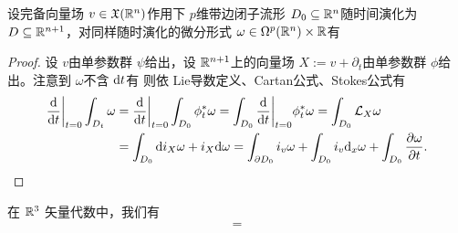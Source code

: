 \begin{theorem}
    设完备向量场 $v\in\mathfrak X(\mathbb{R}^n)$作用下 $p$维带边闭子流形 $D_0\subseteq\mathbb{R}^n$随时间演化为 $D\subseteq\mathbb{R}^{n+1}$，对同样随时演化的微分形式 $\omega\in\Omega^p(\mathbb{R}^n)\times\mathbb{R}$有 
\end{theorem}
\begin{proof}
    设 $v$由单参数群 $\psi$给出，设 $\mathbb{R}^{n+1}$上的向量场 $X:=v+\partial_t$由单参数群 $\phi$给出。注意到 $\omega$不含 $\dd t$有
    则依 Lie导数定义、Cartan公式、Stokes公式有
    \begin{align*} \dv{t}\bigg|_{t=0}\int_{D_t}\omega&=\dv{t}\bigg|_{t=0}\int_{D_0}\phi_t^*\omega =\int_{D_0}\dv{t}\bigg|_{t=0}\phi_t^*\omega=\int_{D_0}\mathcal L_X\omega\\ &=\int_{D_0}\dd i_X\omega+i_X\dd\omega =\int_{\partial D_0}i_v\omega+\int_{D_0}i_v\dd_x\omega+\int_{D_0}\frac{\partial\omega}{\partial t}.\qedhere \end{align*}
\end{proof}

\begin{eg}
    在 $\mathbb{R}^3$ 矢量代数中，我们有
    \begin{align*}
        =
    \end{align*}
\end{eg}
